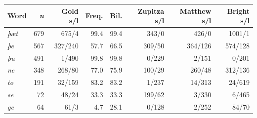 \begin{tabular}{@{}lrrrrrrr@{}}
\toprule
Word & \textit{n} & Gold s/l & Freq. & Bil. & Zupitza s/l & Matthew s/l & Bright s/l \\
\midrule
\textit{þæt} & 679 & 675/4 & 99.4 & 99.4 & 343/0 & 426/0 & 1001/1 \\
\textit{þe} & 567 & 327/240 & 57.7 & 66.5 & 309/50 & 364/126 & 574/128 \\
\textit{þu} & 491 & 1/490 & 99.8 & 99.8 & 0/229 & 2/151 & 0/201 \\
\textit{ne} & 348 & 268/80 & 77.0 & 75.9 & 100/29 & 260/48 & 312/136 \\
\textit{to} & 191 & 32/159 & 83.2 & 83.2 & 1/237 & 14/313 & 24/619 \\
\textit{se} & 72 & 48/24 & 33.3 & 33.3 & 199/62 & 3/330 & 6/465 \\
\textit{ge} & 64 & 61/3 & 4.7 & 28.1 & 0/128 & 2/252 & 84/70 \\
\bottomrule
\end{tabular}
